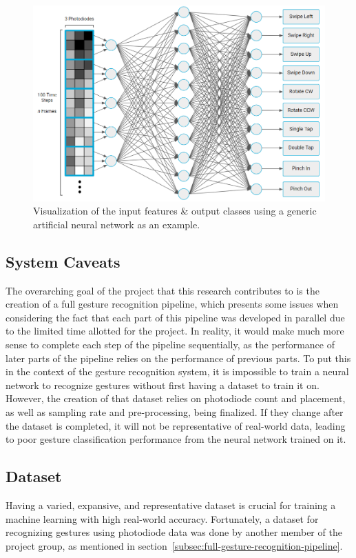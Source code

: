 \begin{figure}[h]
    \centering
    \captionsetup{justification=centering}
    \includegraphics[width=\linewidth]{figures/system_advanced}
    \caption{Visualization of the input features \& output classes using a generic artificial neural network as an example.}
    \label{fig:system}
\end{figure}

\subsection{System Caveats}\label{subsec:system-caveats}
The overarching goal of the project that this research contributes to is the creation of a full gesture recognition pipeline, which presents some issues when considering the fact that each part of this pipeline was developed in parallel due to the limited time allotted for the project.
In reality, it would make much more sense to complete each step of the pipeline sequentially, as the performance of later parts of the pipeline relies on the performance of previous parts.
To put this in the context of the gesture recognition system, it is impossible to train a neural network to recognize gestures without first having a dataset to train it on.
However, the creation of that dataset relies on photodiode count and placement, as well as sampling rate and pre-processing, being finalized.
If they change after the dataset is completed, it will not be representative of real-world data, leading to poor gesture classification performance from the neural network trained on it.

\subsection{Dataset}\label{subsec:dataset}
Having a varied, expansive, and representative dataset is crucial for training a machine learning with high real-world accuracy.
Fortunately, a dataset for recognizing gestures using photodiode data was done by another member of the project group, as mentioned in section~\ref{subsec:full-gesture-recognition-pipeline}.

